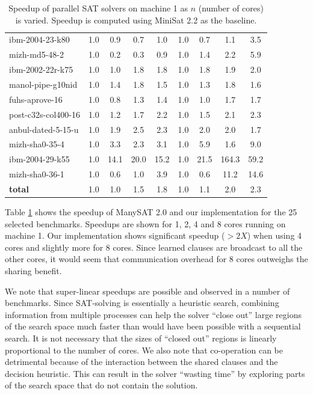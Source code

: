 \documentclass[letterpaper, compsoc, conference]{IEEEtran}
\begin{document}
\begin{table}[htbp]
\begin{center}
\begin{tabular}{|l|c|c|c|c|c|c|c|c|}
        ibm-2004-23-k80                    &       1.0 &  0.9 &  0.7 &  1.0 &  1.0 &  0.7 &  1.1 &  3.5 \\
        mizh-md5-48-2                      &       1.0 &  0.2 &  0.3 &  0.9 &  1.0 &  1.4 &  2.2 &  5.9 \\
        ibm-2002-22r-k75                   &       1.0 &  1.0 &  1.8 &  1.8 &  1.0 &  1.8 &  1.9 &  2.0 \\
        manol-pipe-g10nid                  &       1.0 &  1.4 &  1.8 &  1.5 &  1.0 &  1.3 &  1.8 &  1.6 \\
        fuhs-aprove-16                     &       1.0 &  0.8 &  1.3 &  1.4 &  1.0 &  1.0 &  1.7 &  1.7 \\
        post-c32s-col400-16                &       1.0 &  1.2 &  1.7 &  2.2 &  1.0 &  1.5 &  2.1 &  2.3 \\
        anbul-dated-5-15-u                 &       1.0 &  1.9 &  2.5 &  2.3 &  1.0 &  2.0 &  2.0 &  1.7 \\
        mizh-sha0-35-4                     &       1.0 &  3.3 &  2.3 &  3.1 &  1.0 &  5.9 &  1.6 &  9.0 \\
        ibm-2004-29-k55                    &       1.0 & 14.1 & 20.0 & 15.2 &  1.0 & 21.5 &164.3 & 59.2 \\
        mizh-sha0-36-1                     &       1.0 &  0.6 &  1.0 &  3.9 &  1.0 &  0.6 & 11.2 & 14.6 \\
        \hline
        \textbf{total}                     &       1.0 &  1.0 &  1.5 &  1.8 &  1.0 &  1.1 &  2.0 &  2.3 \\
        \hline
    \end{tabular}
    \end{center}
    \caption{Speedup of parallel SAT solvers on machine 1 as $n$ (number of
    cores) is varied. Speedup is computed using MiniSat 2.2 as the baseline. }
    \label{tab:speedup}
\end{table}

Table \ref{tab:speedup} shows the speedup of ManySAT 2.0 and our implementation
for the 25 selected benchmarks. Speedups are shown for 1, 2, 4 and 8 cores
running on machine 1.  Our implementation shows significant speedup ($>2X$)
when using 4 cores and slightly more for 8 cores. Since learned clauses are
broadcast to all the other cores, it would seem that communication overhead
for 8 cores outweighs the sharing benefit. 

We note that super-linear speedups are possible and observed in a number of
benchmarks.  Since SAT-solving is essentially a heuristic search, combining
information from multiple processes can help the solver ``close out'' large
regions of the search space much faster than would have been possible with a
sequential search. It is not necessary that the sizes of ``closed out'' regions
is linearly proportional to the number of cores. We also note that co-operation
can be detrimental because of the interaction between the shared clauses and
the decision heuristic.  This can result in the solver ``wasting time'' by
exploring parts of the search space that do not contain the solution.
\end{document}
